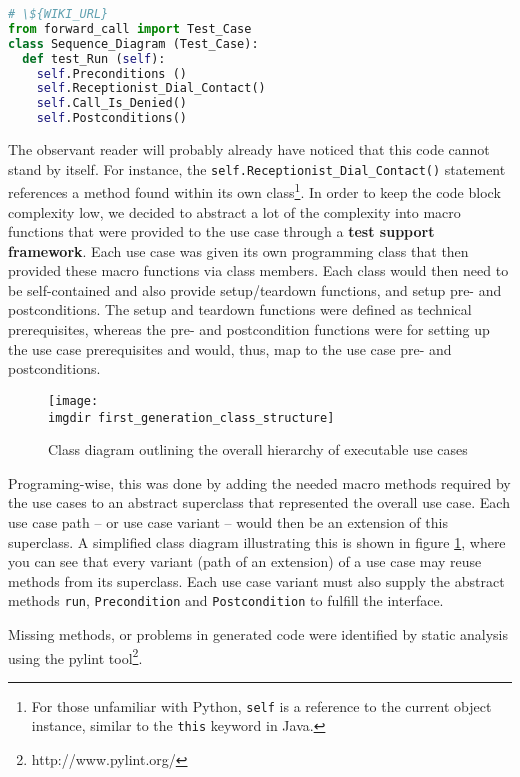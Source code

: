 \begin{lstlisting}[language=Python, caption=Example generated Python code output, label=lst:example_python_output]
# \${WIKI_URL}
from forward_call import Test_Case
class Sequence_Diagram (Test_Case):
  def test_Run (self):
    self.Preconditions ()
    self.Receptionist_Dial_Contact()
    self.Call_Is_Denied()
    self.Postconditions()

\end{lstlisting}

\noindent
The observant reader will probably already have noticed that this code cannot stand by itself. For instance, the \texttt{self.Receptionist\_Dial\_Contact()} statement references a method found within its own class\footnote{For those unfamiliar with Python, \texttt{self} is a reference to the current object instance, similar to the \texttt{this} keyword in Java.}. In order to keep the code block complexity low, we decided to abstract a lot of the complexity into macro functions that were provided to the use case through a \textbf{test support framework}. Each use case was given its own programming class that then provided these macro functions via class members. Each class would then need to be self-contained and also provide setup/teardown functions, and setup pre- and postconditions. The setup and teardown functions were defined as technical prerequisites, whereas the pre- and postcondition functions were for setting up the use case prerequisites and would, thus, map to the use case pre- and postconditions.\medskip
\begin{figure}[!h]
\centering
\texttt{[image: \\imgdir first\_generation\_class\_structure]}
\caption{Class diagram outlining the overall hierarchy of executable use cases}
\label{fig:first_generation_class_structure}
\end{figure}
\noindent Programing-wise, this was done by adding the needed macro methods required by the use cases to an abstract superclass that represented the overall use case. Each use case path -- or use case variant -- would then be an extension of this superclass. A simplified class diagram illustrating this is shown in figure \ref{fig:first_generation_class_structure}, where you can see that every variant (path of an extension) of a use case may reuse methods from its superclass. Each use case variant must also supply the abstract methods \texttt{run}, \texttt{Precondition} and \texttt{Postcondition} to fulfill the interface.\medskip

\noindent Missing methods, or problems in generated code were identified by static analysis using the pylint tool\footnote{http://www.pylint.org/}.

